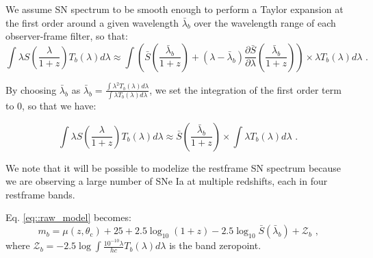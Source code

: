\documentclass[\docopts]{\docclass}
\begin{document}
We assume SN spectrum to be smooth enough to perform a Taylor expansion at the first order around a given wavelength $\bar\lambda_b$ over the wavelength range of each observer-frame filter, so that:
\begin{equation}
\int \lambda S\left(\frac{\lambda}{1+z}\right) T_b(\lambda) d\lambda \approx \int \left( \bar{S}\left(\frac{\bar\lambda_b }{1+z}\right) + (\lambda - \bar\lambda_b)\frac{\partial\bar{S}}{\partial\lambda}\left(\frac{\bar\lambda_b }{1+z}\right)\right)\times \lambda T_b(\lambda) d\lambda \text{ .}
\end{equation}

By choosing $\bar\lambda_b$ as $\bar\lambda_b = \frac{\int \lambda^2 T_b(\lambda) d\lambda}{\int \lambda T_b(\lambda) d\lambda}$, we set the integration of the first order term to 0, so that we have:

\begin{equation}
\int \lambda S\left(\frac{\lambda}{1+z}\right) T_b(\lambda) d\lambda \approx \bar{S}(\frac{\bar\lambda_b }{1+z}) \times \int \lambda T_b(\lambda) d\lambda \text{ .}
\end{equation}

We note that it will be possible to modelize the restframe SN spectrum because we are observing a large number of SNe Ia at multiple redshifts, each in four restframe bands.



Eq. \ref{eq::raw_model} becomes:          
\begin{equation}
  m_b = \mu(z, \theta_\text{c}) + 25 + 2.5\log_{10}(1+z) - 2.5 \log_{10} \bar{S}(\bar\lambda_b ) + \mathcal{Z}_b \text{ ,}
\end{equation}
where $\mathcal{Z}_b = -2.5 \log \int \frac{10^{-10}\lambda}{hc} T_b(\lambda) d\lambda$ is the band zeropoint.
\end{document}
